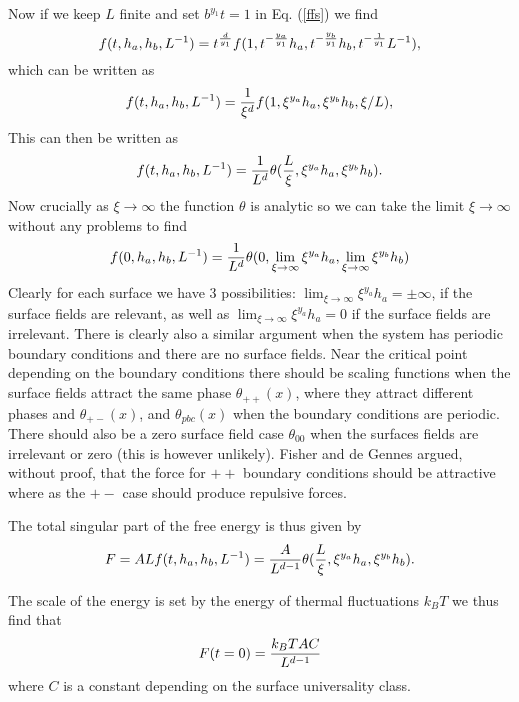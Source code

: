 Now if we keep $L$ finite and set $b^{y_1}t=1$ in Eq. (\ref{ffs}) we find
\begin{equation}
    f(t,h_a,h_b,L^{-1}) = t^{d\over y_1}f(1, t^{-{y_a\over y_1}} h_a, t^{-{y_b\over y_1}} h_b, t^{-{1\over y_1}}L^{-1}), 
    \label{ffs}
\end{equation}
which can be written as
\begin{equation}
    f(t,h_a,h_b,L^{-1}) = {1\over \xi^d}f(1,\xi^{y_a} h_a, \xi^{y_b} h_b, \xi/L),
\end{equation}
This can then be written as
\begin{equation}
    f(t,h_a,h_b,L^{-1}) = {1\over L^d}\theta({L\over \xi}, \xi^{y_a} h_a, \xi^{y_b} h_b).
\end{equation}
Now crucially as $\xi \to \infty$ the function $\theta$ is analytic so we can take the limit $\xi\to\infty$ without any problems to find
\begin{equation}
    f(0,h_a,h_b,L^{-1}) = {1\over L^d}\theta(0, \lim_{\xi\to \infty} \xi^{y_a} h_a,\lim_{\xi\to \infty}  \xi^{y_b} h_b)
\end{equation}
Clearly for each surface we have 3 possibilities: $\lim_{\xi\to \infty} \xi^{y_a} h_a = \pm \infty$, if the surface fields are relevant, as well as $\lim_{\xi\to \infty} \xi^{y_a} h_a = 0$ if the surface fields are irrelevant. There is clearly also a similar argument when the system has periodic boundary conditions and there are no surface fields. Near the critical point depending on the boundary conditions there should be scaling functions  when the surface fields attract the same phase $\theta_{++}(x)$, where they attract different phases and
$\theta_{+-}(x)$, and $\theta_{pbc}(x)$ when the boundary conditions are periodic. There should also be a zero surface field case $\theta_{00}$ when the surfaces fields are irrelevant or zero (this is however unlikely). Fisher and de Gennes argued, without proof, that the force for $++$ boundary conditions should be attractive where as the $+-$ case should produce repulsive forces.   

The total singular part of the free energy is thus given by
\begin{equation}
    F = ALf(t,h_a,h_b,L^{-1}) = {A\over L^{d-1}}\theta({L\over \xi}, \xi^{y_a} h_a, \xi^{y_b} h_b).
\end{equation}

The scale of the energy is set by the energy of thermal fluctuations $k_BT$ we thus find
that 
\begin{equation}
    F(t=0) = {k_BT A C\over L^{d-1}}
    \label{casfreeenergy}
\end{equation}
where $C$ is a constant depending on the surface universality class.


